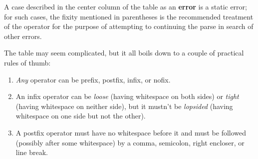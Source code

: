 A case described in the center column of the table as an {\bf error}
is a static error; for such cases, the fixity mentioned in parentheses
is the recommended treatment of the operator for the purpose of
attempting to continuing the parse in search of other errors.

The table may seem complicated, but it all boils down to a couple of practical rules of thumb:
\begin{enumerate}
\item {\it Any} operator can be prefix, postfix, infix, or nofix.

\item An infix operator can be \emph{loose} (having whitespace on both sides)
or \emph{tight} (having whitespace on neither side), but it mustn't be \emph{lopsided}
(having whitespace on one side but not the other).

\item A postfix operator must have no whitespace before it and must
be followed (possibly after some whitespace) by a comma, semicolon, right encloser, or line break.
\end{enumerate}
